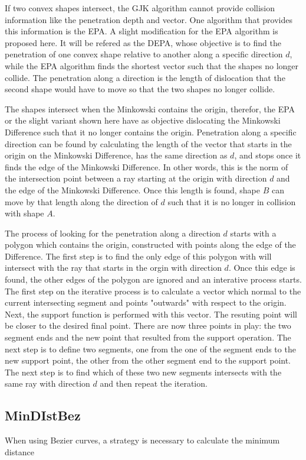 \par If two convex shapes intersect, the \ac{GJK} algorithm cannot provide collision information like the penetration depth and vector. One algorithm that provides this information is the \ac{EPA}.
A slight modification for the \ac{EPA} algorithm is proposed here. It will be refered as the \ac{DEPA}, whose objective is to find the penetration of one convex shape relative to another along a specific direction $d$, while the \ac{EPA} algorithm finds the shortest vector such that the shapes no longer collide. The penetration along a direction is the length of dislocation that the second shape would have to move so that the two shapes no longer collide. 
\par The shapes intersect when the Minkowski contains the origin, therefor, the \ac{EPA} or the slight variant shown here have as objective dislocating the Minkowski Difference such that it no longer contains the origin. Penetration along a specific direction can be found by calculating the length of the vector that starts in the origin on the Minkowski Difference, has the same direction as $d$, and stops once it finds the edge of the Minkowski Difference. In other words, this is the norm of the intersection point between a ray starting at the origin with direction $d$ and the edge of the Minkowski Difference. Once this length is found, shape $B$ can move by that length along the direction of $d$ such that it is no longer in collision with shape $A$.
\par The process of looking for the penetration along a direction $d$ starts with a polygon which contains the origin, constructed with points along the edge of the Difference. The first step is to find the only edge of this polygon with will intersect with the ray that starts in the orgin with direction $d$. Once this edge is found, the other edges of the polygon are ignored and an interative process starts. The first step on the iterative process is to calculate a vector which normal to the current intersecting segment and points "outwards" with respect to the origin. Next, the support function is performed with this vector. The resuting point will be closer to the desired final point. There are now three points in play: the two segment ends and the new point that resulted from the support operation. The next step is to define two segments, one from the one of the segment ends to the new support point, the other from the other segment end to the support point. The next step is to find which of these two new segments intersects with the same ray with direction $d$ and then repeat the iteration. 


\subsection{MinDIstBez}

\par When using Bezier curves, a strategy is necessary to calculate the minimum distance 




